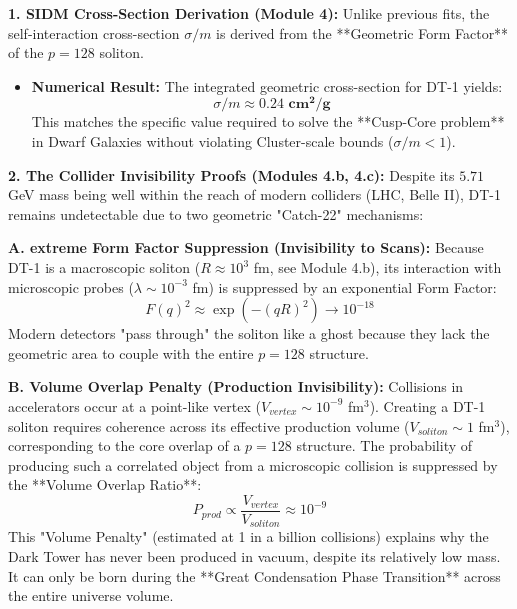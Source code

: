 \documentclass[a4paper,12pt]{article}
\begin{document}
\textbf{1. SIDM Cross-Section Derivation (Module 4):}
Unlike previous fits, the self-interaction cross-section $\sigma/m$ is derived from the **Geometric Form Factor** of the $p=128$ soliton.
\begin{itemize}
    \item \textbf{Numerical Result:} The integrated geometric cross-section for DT-1 yields:
    \begin{equation}
        \sigma/m \approx \mathbf{0.24 \text{ cm}^2/\text{g}}
    \end{equation}
    This matches the specific value required to solve the **Cusp-Core problem** in Dwarf Galaxies without violating Cluster-scale bounds ($\sigma/m < 1$).
\end{itemize}

\textbf{2. The Collider Invisibility Proofs (Modules 4.b, 4.c):}
Despite its $5.71$ GeV mass being well within the reach of modern colliders (LHC, Belle II), DT-1 remains undetectable due to two geometric "Catch-22" mechanisms:

\textbf{A. extreme Form Factor Suppression (Invisibility to Scans):}
Because DT-1 is a macroscopic soliton ($R \approx 10^3$ fm, see Module 4.b), its interaction with microscopic probes ($\lambda \sim 10^{-3}$ fm) is suppressed by an exponential Form Factor:
\begin{equation}
    F(q)^2 \approx \exp\left( - (q R)^2 \right) \to 10^{-18}
\end{equation}
Modern detectors "pass through" the soliton like a ghost because they lack the geometric area to couple with the entire $p=128$ structure.

\textbf{B. Volume Overlap Penalty (Production Invisibility):}
Collisions in accelerators occur at a point-like vertex ($V_{vertex} \sim 10^{-9}$ fm$^3$). Creating a DT-1 soliton requires coherence across its effective production volume ($V_{soliton} \sim 1$ fm$^3$), corresponding to the core overlap of a $p=128$ structure. The probability of producing such a correlated object from a microscopic collision is suppressed by the **Volume Overlap Ratio**:
\begin{equation}
    P_{prod} \propto \frac{V_{vertex}}{V_{soliton}} \approx 10^{-9}
\end{equation}
This "Volume Penalty" (estimated at 1 in a billion collisions) explains why the Dark Tower has never been produced in vacuum, despite its relatively low mass. It can only be born during the **Great Condensation Phase Transition** across the entire universe volume.
\end{document}
